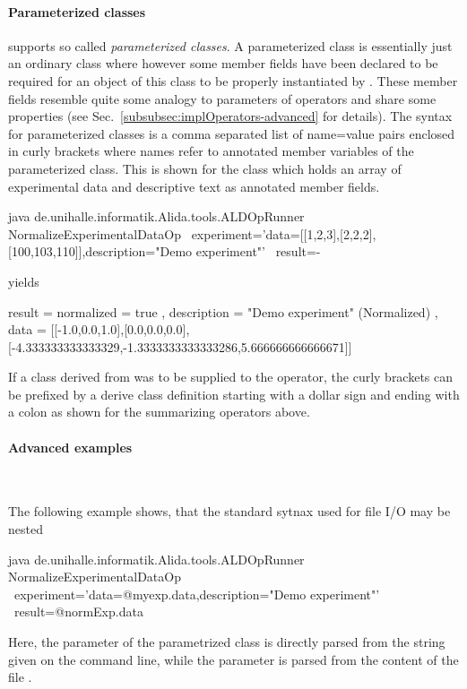 \paragraph{Parameterized classes}
\alida supports so called \textit{parameterized classes}.
A parameterized class is essentially just an ordinary class where
however some member fields have been declared 
to be required
for an object of this class to be properly instantiated by \alida.
These member fields resemble quite some analogy to parameters of operators
and share some properties (see Sec.~\ref{subsubsec:implOperators-advanced} 
for details).
The syntax for parameterized classes is a comma separated list of name=value pairs
enclosed in curly brackets where names refer to annotated member variables of
the parameterized class.
This is shown for the class 
which holds an array of experimental data and descriptive text as annotated member fields.

\begin{code}
java de.unihalle.informatik.Alida.tools.ALDOpRunner NormalizeExperimentalDataOp \
	experiment='{data=[[1,2,3],[2,2,2],[100,103,110]],description="Demo experiment"}' \
	result=-
\end{code}
yields
\begin{code}
result = { normalized = true , 
          description = "Demo experiment" (Normalized) , 
          data = [[-1.0,0.0,1.0],[0.0,0.0,0.0],
                  [-4.333333333333329,-1.3333333333333286,5.666666666666671]] }
\end{code}

If a class derived from  was to be supplied to the operator,
the curly brackets can be prefixed by a derive class definition starting with a dollar sign
and ending with a colon as shown for the summarizing operators above.

\paragraph{Advanced examples} ~


The following example shows, that the standard sytnax used  for file I/O
may be nested
\begin{code}
  java de.unihalle.informatik.Alida.tools.ALDOpRunner NormalizeExperimentalDataOp \
      experiment='{data=@myexp.data,description="Demo experiment"}' \ 
      result=@normExp.data
\end{code}
Here, the parameter \icode{description} of the parametrized class  
is directly parsed from the string given on the command line, while
the parameter \icode{data} is parsed from the content of the file .

